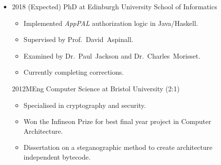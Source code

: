\documentclass[a4paper,10pt,selectp]{book}
\newcommand{\lowercaps}[1]{\textsc{\MakeLowercase{#1}}}
\newcommand{\sideheading}[1]{\vspace{0.5em}\marginnote[\color{BrickRed}\raggedleft\lowercaps{#1}]{\raggedleft\lowercaps{#1}}}
\newcommand{\listhead}[1]{#1}
\begin{document}
\begin{itemize}
\item[] 
  \sideheading{Education}%
		\listhead{2018\hspace{1em} (Expected) PhD at Edinburgh University School of Informatics}
  \begin{itemize}
    Users and companies have opinions and policies about how their mobile devices should be used.
    These policies are often expressed in natural language which can be imprecise.
    Using an authorization logic I showed how to capture and encode these policies.
    This let me show how to enforce the policies with automatic tools.
    It also allowed me to compare and contrast policies precisely.
    My work during the PhD led to full publications contrasting user's privacy
    preferences with their app installation habits (AppPAL for Android), and
    describing precisely the concerns and trust relationships in BYOD policies
    (Capturing Policies for BYOD).
  \item[\textbullet] Implemented \emph{AppPAL} authorization logic in Java/Haskell.
  \item[\textbullet] Supervised by Prof.~David~Aspinall.
  \item[\textbullet] Examined by Dr.~Paul~Jackson and Dr.~Charles~Morisset.
  \item[\textbullet] Currently completing corrections.
  \end{itemize}
  \listhead{2012\hspace{1em}MEng Computer Science at Bristol University (2:1)}
  \begin{itemize}
  \item[\textbullet] Specialised in cryptography and security.
  \item[\textbullet] Won the Infineon Prize for best final year project in Computer Architecture.
  \item[\textbullet] Dissertation on a steganographic method to create architecture independent bytecode.
  \end{itemize}
\end{itemize}
\end{document}
